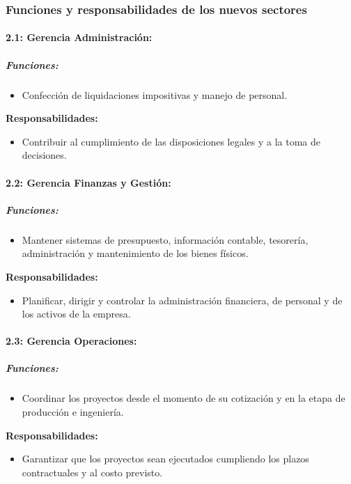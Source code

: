 \documentclass[a4paper,10pt]{article}
\begin{document}
	\subsubsection{Funciones y responsabilidades de los nuevos sectores}
	\paragraph{2.1: Gerencia Administración:}
	\subparagraph{Funciones:}
	\begin{itemize}
		\item Confección de liquidaciones impositivas y manejo de personal.
	\end{itemize}

	\textbf{Responsabilidades:}
	\begin{itemize}
		\item Contribuir al cumplimiento de las disposiciones legales y a la toma de decisiones.
	\end{itemize}
	
	\paragraph{2.2: Gerencia Finanzas y Gestión:}
	\subparagraph{Funciones:}
	\begin{itemize}
		\item Mantener sistemas de presupuesto, información contable, tesorería, administración y mantenimiento de los bienes físicos.
	\end{itemize}

	\textbf{Responsabilidades:}
	\begin{itemize}
		\item Planificar, dirigir y controlar la administración financiera, de personal y de los activos de la empresa.
	\end{itemize}

	\paragraph{2.3: Gerencia Operaciones:}

	\subparagraph{Funciones:}
	\begin{itemize}
		\item Coordinar los proyectos desde el momento de su cotización y en la etapa de producción e ingeniería.
	\end{itemize}

	\textbf{Responsabilidades:}
	\begin{itemize}
		\item Garantizar que los proyectos sean ejecutados cumpliendo los plazos contractuales y al costo previsto.
	\end{itemize}
			
\end{document}
